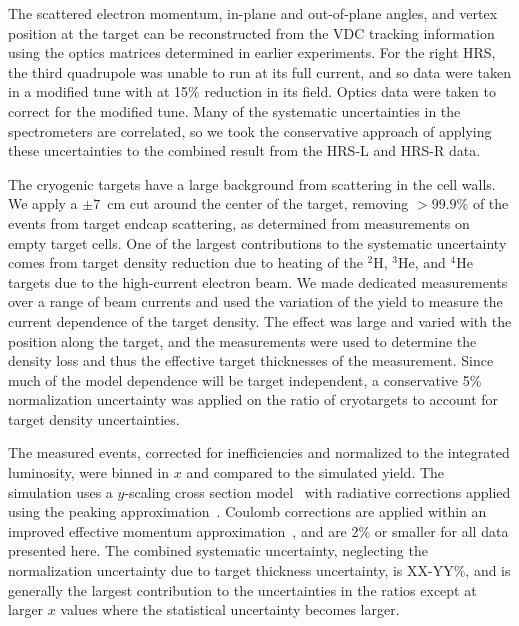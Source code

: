 \documentclass[aps,prl,superscriptaddress,showpacs,twocolumn,floatfix,amsmath,amssymb]{revtex4-1}
\begin{document}
The scattered electron momentum, in-plane and out-of-plane angles, and vertex position at the target can be
reconstructed from the VDC tracking information using the optics matrices determined in earlier experiments.
For the right HRS, the third quadrupole was unable to run at its full current, and so data were taken in a
modified tune with at 15\% reduction in its field. Optics data were taken to correct for the modified
tune. Many of the systematic uncertainties in the spectrometers are correlated, so we took the
conservative approach of applying these uncertainties to the combined result from the HRS-L and HRS-R data.


The cryogenic targets have a large background from scattering in the cell walls. We apply a $\pm 7$~cm
cut around the center of the target, removing $>99.9\%$ of the events from target endcap
scattering, as determined from measurements on empty target cells. One of the largest contributions to the
systematic uncertainty comes from target density reduction due to heating of the $^2$H, $^3$He, and $^4$He
targets due to the high-current electron beam. We made dedicated measurements over a range of
beam currents and used the variation of the yield to measure the current dependence of the target density.
The effect was large and varied with the position along the target, and the measurements were used to
determine the density loss and thus the effective target thicknesses of the measurement. Since much 
of the model dependence will be target independent, a conservative 5\% normalization uncertainty was applied
on the ratio of cryotargets to account for target density uncertainties.


The measured events, corrected for inefficiencies and normalized to the integrated luminosity, were binned
in $x$ and compared to the simulated yield. The simulation uses a $y$-scaling cross section
model~\cite{day_arns, arrington99} with radiative corrections applied using the peaking
approximation~\cite{zye_thesis, stein75}. Coulomb corrections are applied within an improved effective
momentum approximation~\cite{aste05}, and are 2\% or smaller for all data presented here.  The combined 
systematic uncertainty, neglecting the normalization uncertainty due to target thickness uncertainty,
is XX-YY\%, and is generally the largest contribution to the uncertainties in the ratios except at larger
$x$ values where the statistical uncertainty becomes larger.
\end{document}

